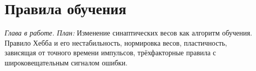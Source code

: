 \chapter{Правила обучения}
\label{sec:learning}

\emph{Глава в работе. План:} Изменение синаптических весов как алгоритм обучения. Правило Хебба и его нестабильность, нормировка весов, пластичность, зависящая от точного времени импульсов, трёхфакторные правила с широковещательным сигналом ошибки.
